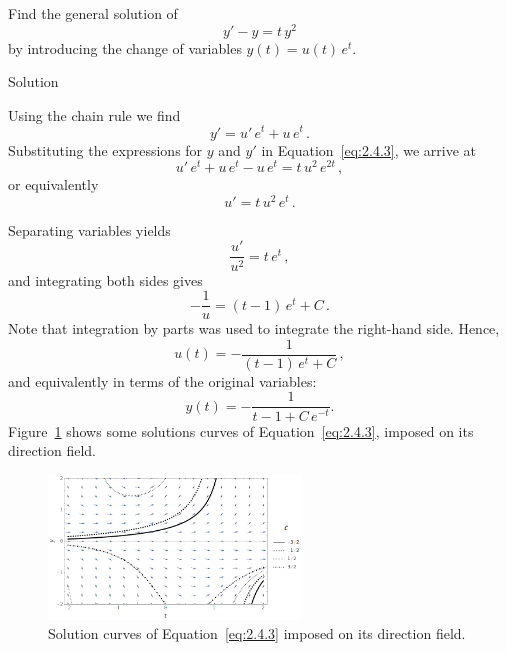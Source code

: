 \begin{example}\label{example:2.4.1} 
Find the general solution of
\begin{equation} \label{eq:2.4.3}
y'-y=t\,y^2
\end{equation}
by introducing the change of variables $y(t)=u(t)\,e^t$.

Solution 

Using the chain rule we find
$$
y'=u'\,e^t+u\,e^t\,.
$$
Substituting the expressions for $y$ and $y'$ in Equation~\eqref{eq:2.4.3}, we arrive at
$$
u'\,e^t+u\,e^t-u\,e^t=t\,u^2\,e^{2t}\,,
$$
or equivalently
$$
u'=t\,u^2\,e^t\,.
$$

Separating variables yields
$$
\dfrac{u'}{u^2}=t\,e^t\,,
$$
and integrating both sides gives
$$
-\dfrac{1}{u}=(t-1)\,e^t+C\,.
$$
Note that integration by parts was used to integrate the right-hand side.
Hence,
$$
u(t)=-\dfrac{1}{(t-1)\,e^t+C}\,,
$$
and equivalently in terms of the original variables:
$$
y(t)=-\dfrac{1}{t-1+C\,e^{-t}}.
$$
 Figure~\ref{ettrans1} shows some solutions curves of Equation~\eqref{eq:2.4.3}, imposed on its direction field. 

\begin{figure}[H]
	\begin{center}
			\includegraphics[width=0.6\textwidth]{extrans1}
	\caption{Solution curves of Equation~\eqref{eq:2.4.3} imposed on its direction field.}
	\label{ettrans1}
	\end{center}
\end{figure}

\end{example}

